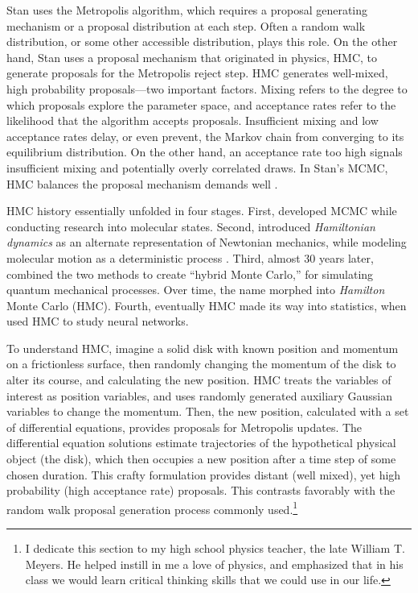 Stan uses the Metropolis algorithm, which requires a proposal generating mechanism or a proposal distribution at each step. Often a random walk distribution, or some other accessible distribution, plays this role. On the other hand, Stan uses a proposal mechanism that originated in physics, HMC, to generate proposals for the Metropolis reject step. HMC generates well-mixed, high probability proposals---two important factors. Mixing refers to the degree to which proposals explore the parameter space, and acceptance rates refer to the likelihood that the algorithm accepts proposals. Insufficient mixing and low acceptance rates delay, or even prevent, the Markov chain from converging to its equilibrium distribution. On the other hand, an acceptance rate too high signals insufficient mixing and potentially overly correlated draws. In Stan's MCMC, HMC balances the proposal mechanism demands well \citep{Neal2011}. 

HMC history essentially unfolded in four stages. First, \cite{Metropolis1953} developed MCMC while conducting research into molecular states. Second, \cite{Alder1959} introduced {\it Hamiltonian dynamics} as an alternate representation of Newtonian mechanics, while modeling molecular motion as a deterministic process \citep{Newt}. Third, almost 30 years later, \cite{Duane1987} combined the two methods to create ``hybrid Monte Carlo,'' for simulating quantum mechanical processes. Over time, the name morphed into {\it Hamilton} Monte Carlo (HMC). Fourth, eventually HMC made its way into statistics, when \cite{Neal1996} used HMC to study neural networks.

To understand HMC, imagine a solid disk with known position and momentum on a frictionless surface, then randomly changing the momentum of the disk to alter its course, and calculating the new position. HMC treats the variables of interest as position variables, and uses randomly generated auxiliary Gaussian variables to change the momentum. Then, the new position, calculated with a set of differential equations, provides proposals for Metropolis updates. The differential equation solutions estimate trajectories of the hypothetical physical object (the disk), which then occupies a new position after a time step of some chosen duration. This crafty formulation provides distant (well mixed), yet high probability (high acceptance rate) proposals. This contrasts favorably with the random walk proposal generation process commonly used.\footnote{I dedicate this section to my high school physics teacher, the late William T. Meyers. He helped instill in me a love of physics, and emphasized that in his class we would learn critical thinking skills that we could use in our life.}

